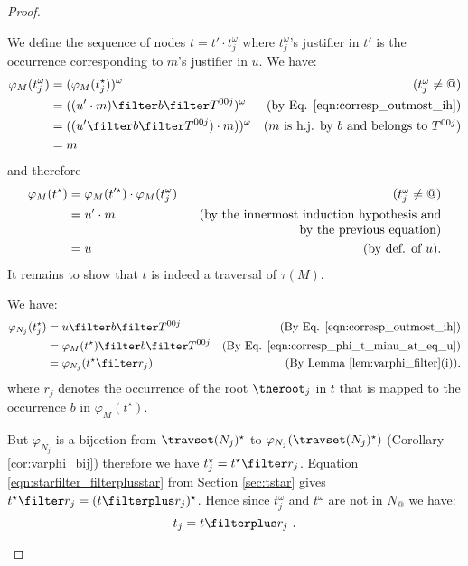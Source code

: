 \begin{proof}
\begin{enumerate}[$\bullet$]
\begin{enumerate}
\begin{enumerate}[-]
        We define the sequence of nodes $t = t'\cdot
        t_j^\omega$ where $t_j^\omega$'s justifier in $t'$ is the occurrence corresponding to $m$'s
        justifier in $u$. We have:
        \begin{align*}
            \varphi_M (t_j^\omega) &= (\varphi_M (t_j^\star))^\omega & \mbox{($t_j^\omega \neq @$)}\\
                                   &= ((u' \cdot m) \filter b\filter T^{00j})^\omega & \mbox{(by Eq. \ref{eqn:corresp_outmost_ih})}\\
                                   &= ((u' \filter b\filter T^{00j}) \cdot m))^\omega & \mbox{($m$ is h.j. by $b$ and belongs to $T^{00j}$)}\\
                                   &= m
        \end{align*}
        and therefore
        \begin{align}
          \varphi_{M}(t^\star)  &=  \varphi_{M}(t'^\star)  \cdot \varphi_{M}(t_j^\omega) & \mbox{($t_j^\omega \neq @$)} \nonumber \\
                &=   u' \cdot m & \parbox[t]{7cm}{\raggedleft (by the innermost induction hypothesis and by the previous equation)} \nonumber \\
                &=   u & \mbox{(by def. of $u$).} \label{eqn:corresp_phi_t_minu_at_eq_u}
        \end{align}
        It remains to show that $t$ is indeed a traversal of $\tau(M)$.

        We have:
        \begin{align*}
        \varphi_{N_j}(t_j^\star) &= u \filter b \filter T^{00j}
            & \mbox{(By Eq. \ref{eqn:corresp_outmost_ih})} \\
         &= \varphi_{M}(t^\star) \filter b \filter T^{00j}
            & \mbox{(By Eq. \ref{eqn:corresp_phi_t_minu_at_eq_u})} \\
         &= \varphi_{N_j}(t^\star \filter r_j )
            & \mbox{(By Lemma \ref{lem:varphi_filter}(i)).}
        \end{align*}
        where $r_j$ denotes the occurrence of the root
        $\theroot_j$ in $t$ that is mapped to the
        occurrence $b$ in $\varphi_{M}(t^\star)$.

        But $\varphi_{N_j}$ is a bijection from
        $\travset(N_j)^\star$ to $\varphi_{N_j}(
        \travset(N_j)^\star )$ (Corollary
        \ref{cor:varphi_bij}) therefore we have
        $t_j^\star = t^\star \filter r_j $. Equation
        \ref{eqn:starfilter_filterplusstar} from Section
        \ref{sec:tstar} gives $t^\star \filter r_j =
        (t\filterplus r_j)^\star$. Hence since
        $t_j^\omega$ and $t^\omega$ are not in $N_@$ we
        have:
        $$t_j = t \filterplus r_j \ .$$


\end{enumerate}
\end{enumerate}
\end{enumerate}
\end{proof}

